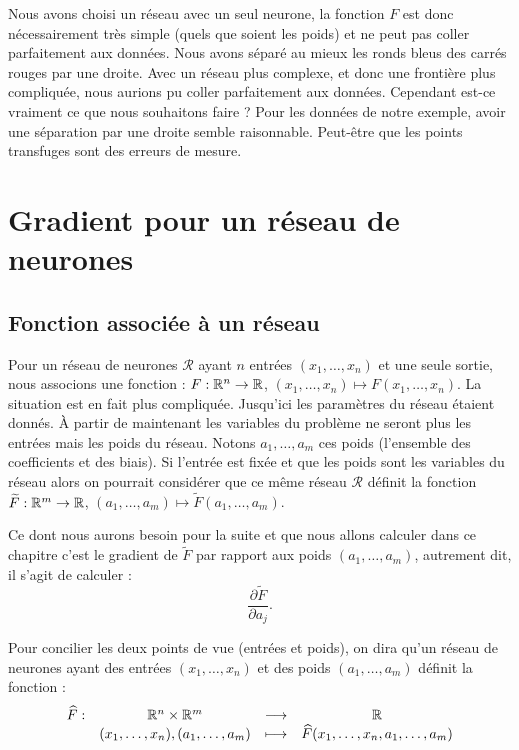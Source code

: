 {\begin{exemple}{}{}
	
	Nous avons choisi un réseau avec un seul neurone, la fonction $F$ est donc nécessairement très simple (quels que soient les poids) et ne peut pas \og{}coller\fg{} parfaitement aux données. 
	Nous avons séparé au mieux les ronds bleus des carrés rouges par une droite. Avec un réseau plus complexe, et donc une frontière plus compliquée, nous aurions pu \og{}coller\fg{} parfaitement aux données. Cependant est-ce vraiment ce que nous souhaitons faire ? Pour les données de notre exemple, avoir une séparation par une droite semble raisonnable. Peut-être que les points transfuges sont des erreurs de mesure.
	
\end{exemple}


\section{Gradient pour un réseau de neurones}

\subsection{Fonction associée à un réseau}
\label{ssec:foncres}

Pour un réseau de neurones $\mathcal{R}$ ayant $n$ entrées $(x_1,\ldots,x_n)$ et une seule sortie, nous associons une fonction : $F : \mathbb{R}^n \to \mathbb{R}$,  $(x_1,\ldots,x_n) \mapsto F(x_1,\ldots,x_n)$. La situation est en fait plus compliquée. Jusqu'ici les paramètres du réseau étaient donnés. \`A partir de maintenant les variables du problème ne seront plus les entrées mais les poids du réseau. 
Notons $a_1,\ldots,a_m$ ces poids (l'ensemble des coefficients et des biais). Si l'entrée est fixée et que les poids sont les variables du réseau alors on pourrait considérer que ce même réseau $\mathcal{R}$ définit la fonction 
$\widetilde F : \mathbb{R}^m \to \mathbb{R}$, $(a_1,\ldots,a_m) \mapsto \widetilde F(a_1,\ldots,a_m)$. 



Ce dont nous aurons besoin pour la suite et que nous allons calculer dans ce chapitre c'est le gradient de $\widetilde F$ par rapport aux poids $(a_1,\ldots,a_m)$, autrement dit, il s'agit de calculer :
$$\frac{\partial \widetilde F}{\partial a_j}.$$

Pour concilier les deux points de vue (entrées et poids), on dira qu'un réseau de neurones ayant des entrées $(x_1,\ldots,x_n)$ et des poids 
$(a_1,\ldots,a_m)$ définit la fonction :
$$\begin{array}{lccc}
	\widehat F : & \mathbb{R}^n             \times  \mathbb{R}^m & \longrightarrow & \mathbb{R} \\
	& (x_1,\ldots,x_n)  ,  (a_1,\ldots,a_m) & \longmapsto & \widehat F(x_1,\ldots,x_n,a_1,\ldots,a_m) \\
\end{array}$$

}
